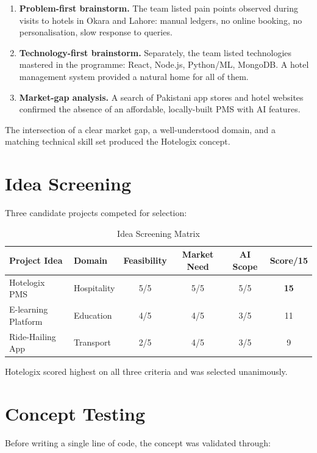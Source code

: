 \documentclass[12pt,a4paper]{report}
\begin{document}
\begin{enumerate}[leftmargin=*, label=\arabic*.]
  \item \textbf{Problem-first brainstorm.} The team listed pain points observed during visits to hotels in Okara and Lahore: manual ledgers, no online booking, no personalisation, slow response to queries.
  \item \textbf{Technology-first brainstorm.} Separately, the team listed technologies mastered in the programme: React, Node.js, Python/ML, MongoDB. A hotel management system provided a natural home for all of them.
  \item \textbf{Market-gap analysis.} A search of Pakistani app stores and hotel websites confirmed the absence of an affordable, locally-built PMS with AI features.
\end{enumerate}

The intersection of a clear market gap, a well-understood domain, and a matching technical skill set produced the Hotelogix concept.

\section{Idea Screening}

Three candidate projects competed for selection:

\begin{table}[H]
\centering
\begin{tabularx}{\textwidth}{l X c c c c}
\toprule
\textbf{Project Idea} & \textbf{Domain} & \textbf{Feasibility} & \textbf{Market Need} & \textbf{AI Scope} & \textbf{Score/15} \\
\midrule
Hotelogix PMS       & Hospitality & 5/5 & 5/5 & 5/5 & \textbf{15} \\
E-learning Platform & Education   & 4/5 & 4/5 & 3/5 & 11 \\
Ride-Hailing App    & Transport   & 2/5 & 4/5 & 3/5 & 9  \\
\bottomrule
\end{tabularx}
\caption{Idea Screening Matrix}
\end{table}

Hotelogix scored highest on all three criteria and was selected unanimously.

\section{Concept Testing}

Before writing a single line of code, the concept was validated through:
\end{document}
